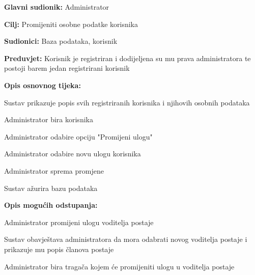 					\noindent {}
					\begin{packed_item}
						
						\item \textbf{Glavni sudionik:} Administrator
						\item \textbf{Cilj:} Promijeniti osobne podatke korisnika
						\item \textbf{Sudionici:} Baza podataka, korisnik
						\item \textbf{Preduvjet:} Korisnik je registriran i dodijeljena su mu prava administratora te postoji barem jedan registrirani korisnik
						\item \textbf{Opis osnovnog tijeka:}
						
						\item[] \begin{packed_enum}
							
							\item Sustav prikazuje popis svih registriranih korisnika i njihovih osobnih podataka
							\item Administrator bira korisnika
							\item Administrator odabire opciju "Promijeni ulogu"
							\item Administrator odabire novu ulogu korisnika
							\item Administrator sprema promjene 
							\item Sustav ažurira bazu podataka					
						\end{packed_enum}
						
						\item  \textbf{Opis mogućih odstupanja:}
						
						\item[] \begin{packed_item}
							
							\item[4.a] Administrator promijeni ulogu voditelja postaje
							\item[] \begin{packed_enum}
								
								\item Sustav obavještava administratora da mora odabrati novog voditelja postaje i prikazuje mu popis članova postaje
								\item Administrator bira tragača kojem će promijeniti ulogu u voditelja postaje
								
							\end{packed_enum}
							

\end{packed_item}
\end{packed_item}
